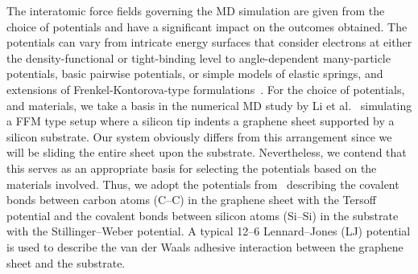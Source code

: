 The interatomic force fields governing the \acrshort{MD} simulation are given from the choice of potentials and have a significant impact on the outcomes obtained. The potentials can vary from intricate energy surfaces that consider electrons at either the density-functional or tight-binding level to angle-dependent many-particle potentials, basic pairwise potentials, or simple models of elastic springs, and extensions of Frenkel-Kontorova-type formulations~\cite{Vanossi_2013}. For the choice of
potentials, and materials, we take a basis in the numerical \acrshort{MD} study
by Li et al.~\cite{li_evolving_2016} simulating a \acrshort{FFM} type setup
where a silicon tip indents a graphene sheet supported by a silicon substrate. Our system obviously differs from this arrangement since we will be sliding the entire sheet upon the substrate. Nevertheless, we contend that this serves as an appropriate basis for selecting the potentials based on the materials involved. Thus, we adopt the potentials from~\cite{li_evolving_2016} describing the covalent bonds between carbon atoms (C--C) in the graphene sheet with the Tersoff potential and the covalent bonds between silicon atoms (Si--Si) in the substrate with the Stillinger–Weber potential. A typical 12--6 Lennard–Jones (\acrshort{LJ}) potential is used to describe the van der Waals adhesive interaction between the graphene sheet and the substrate. 



